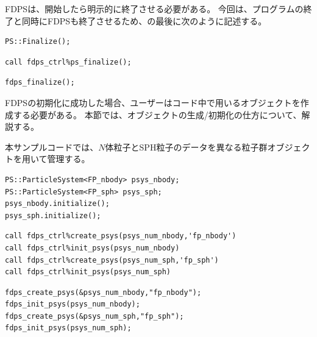 FDPSは、開始したら明示的に終了させる必要がある。
今回は、プログラムの終了と同時にFDPSも終了させるため、\mainFunc の最後に次のように記述する。
\ifCpp %
\begin{lstlisting}[caption=FDPSの終了]
PS::Finalize();
\end{lstlisting}
\endifCpp
\ifFtn %
\begin{lstlisting}[caption=FDPSの終了]
call fdps_ctrl%ps_finalize();
\end{lstlisting}
\endifFtn
\ifC %
\begin{lstlisting}[caption=FDPSの終了]
fdps_finalize();
\end{lstlisting}
\endifC


FDPSの初期化に成功した場合、ユーザーはコード中で用いるオブジェクトを作成する必要がある。
本節では、オブジェクトの生成/初期化の仕方について、解説する。

本サンプルコードでは、$N$体粒子とSPH粒子のデータを異なる粒子群オブジェクトを用いて管理する。
\ifCpp %
\begin{lstlisting}[caption=粒子群オブジェクトの生成・初期化]
PS::ParticleSystem<FP_nbody> psys_nbody;
PS::ParticleSystem<FP_sph> psys_sph;
psys_nbody.initialize();
psys_sph.initialize();
\end{lstlisting}
\endifCpp
\ifFtn %
\begin{lstlisting}[caption=粒子群オブジェクトの生成・初期化]
call fdps_ctrl%create_psys(psys_num_nbody,'fp_nbody')
call fdps_ctrl%init_psys(psys_num_nbody)
call fdps_ctrl%create_psys(psys_num_sph,'fp_sph')
call fdps_ctrl%init_psys(psys_num_sph)
\end{lstlisting}
\endifFtn
\ifC %
\begin{lstlisting}[caption=粒子群オブジェクトの生成・初期化]
fdps_create_psys(&psys_num_nbody,"fp_nbody");
fdps_init_psys(psys_num_nbody);
fdps_create_psys(&psys_num_sph,"fp_sph");
fdps_init_psys(psys_num_sph);
\end{lstlisting}
\endifC


